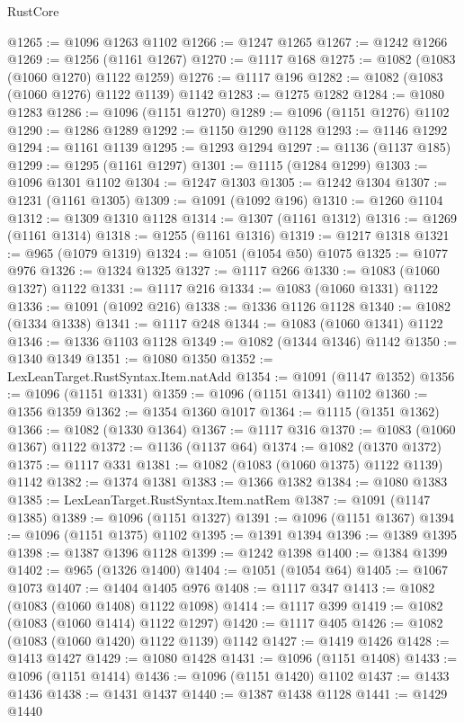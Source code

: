 \begin{lexlean}{RustCore}
\begin{coremodule}
@1265 := @1096 @1263 @1102
@1266 := @1247 @1265
@1267 := @1242 @1266
@1269 := @1256 (@1161 @1267)
@1270 := @1117 @168
@1275 := @1082 (@1083 (@1060 @1270) @1122 @1259)
@1276 := @1117 @196
@1282 := @1082 (@1083 (@1060 @1276) @1122 @1139) @1142
@1283 := @1275 @1282
@1284 := @1080 @1283
@1286 := @1096 (@1151 @1270)
@1289 := @1096 (@1151 @1276) @1102
@1290 := @1286 @1289
@1292 := @1150 @1290 @1128
@1293 := @1146 @1292
@1294 := @1161 @1139
@1295 := @1293 @1294
@1297 := @1136 (@1137 @185)
@1299 := @1295 (@1161 @1297)
@1301 := @1115 (@1284 @1299)
@1303 := @1096 @1301 @1102
@1304 := @1247 @1303
@1305 := @1242 @1304
@1307 := @1231 (@1161 @1305)
@1309 := @1091 (@1092 @196)
@1310 := @1260 @1104
@1312 := @1309 @1310 @1128
@1314 := @1307 (@1161 @1312)
@1316 := @1269 (@1161 @1314)
@1318 := @1255 (@1161 @1316)
@1319 := @1217 @1318
@1321 := @965 (@1079 @1319)
@1324 := @1051 (@1054 @50) @1075
@1325 := @1077 @976
@1326 := @1324 @1325
@1327 := @1117 @266
@1330 := @1083 (@1060 @1327) @1122
@1331 := @1117 @216
@1334 := @1083 (@1060 @1331) @1122
@1336 := @1091 (@1092 @216)
@1338 := @1336 @1126 @1128
@1340 := @1082 (@1334 @1338)
@1341 := @1117 @248
@1344 := @1083 (@1060 @1341) @1122
@1346 := @1336 @1103 @1128
@1349 := @1082 (@1344 @1346) @1142
@1350 := @1340 @1349
@1351 := @1080 @1350
@1352 := LexLeanTarget.RustSyntax.Item.natAdd
@1354 := @1091 (@1147 @1352)
@1356 := @1096 (@1151 @1331)
@1359 := @1096 (@1151 @1341) @1102
@1360 := @1356 @1359
@1362 := @1354 @1360 @1017
@1364 := @1115 (@1351 @1362)
@1366 := @1082 (@1330 @1364)
@1367 := @1117 @316
@1370 := @1083 (@1060 @1367) @1122
@1372 := @1136 (@1137 @64)
@1374 := @1082 (@1370 @1372)
@1375 := @1117 @331
@1381 := @1082 (@1083 (@1060 @1375) @1122 @1139) @1142
@1382 := @1374 @1381
@1383 := @1366 @1382
@1384 := @1080 @1383
@1385 := LexLeanTarget.RustSyntax.Item.natRem
@1387 := @1091 (@1147 @1385)
@1389 := @1096 (@1151 @1327)
@1391 := @1096 (@1151 @1367)
@1394 := @1096 (@1151 @1375) @1102
@1395 := @1391 @1394
@1396 := @1389 @1395
@1398 := @1387 @1396 @1128
@1399 := @1242 @1398
@1400 := @1384 @1399
@1402 := @965 (@1326 @1400)
@1404 := @1051 (@1054 @64)
@1405 := @1067 @1073
@1407 := @1404 @1405 @976
@1408 := @1117 @347
@1413 := @1082 (@1083 (@1060 @1408) @1122 @1098)
@1414 := @1117 @399
@1419 := @1082 (@1083 (@1060 @1414) @1122 @1297)
@1420 := @1117 @405
@1426 := @1082 (@1083 (@1060 @1420) @1122 @1139) @1142
@1427 := @1419 @1426
@1428 := @1413 @1427
@1429 := @1080 @1428
@1431 := @1096 (@1151 @1408)
@1433 := @1096 (@1151 @1414)
@1436 := @1096 (@1151 @1420) @1102
@1437 := @1433 @1436
@1438 := @1431 @1437
@1440 := @1387 @1438 @1128
@1441 := @1429 @1440

\end{coremodule}
\end{lexlean}
